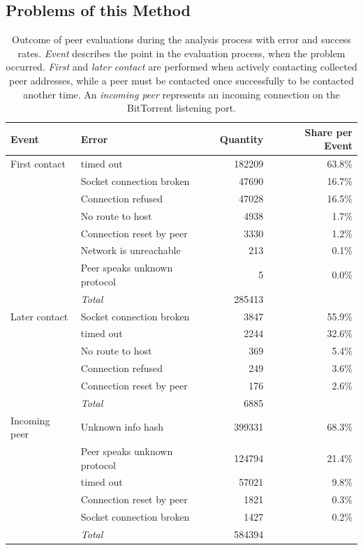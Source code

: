 \documentclass[10pt, a4paper, twoside, headsepline]{scrbook}
\renewcommand{\_}{\origunderscore\allowbreak}
\begin{document}
\subsection{Problems of this Method}
\label{problems}
\begin{table}
\centering
\begin{tabular}{llrr}
\toprule
Event & Error & Quantity & Share per Event \\
\midrule
First contact & timed out & 182209 & 63.8\% \\
& Socket connection broken & 47690 & 16.7\% \\
 & Connection refused & 47028 & 16.5\% \\
 & No route to host & 4938 & 1.7\% \\
 & Connection reset by peer & 3330 & 1.2\% \\
 &  Network is unreachable & 213 & 0.1\% \\
 & Peer speaks unknown protocol & 5 & 0.0\% \\
 & \textit{Total} & 285413 &  \\
\midrule
Later contact & Socket connection broken & 3847 & 55.9\% \\
 & timed out & 2244 & 32.6\% \\
 &  No route to host & 369 & 5.4\% \\
 & Connection refused & 249 & 3.6\% \\
 &  Connection reset by peer & 176 & 2.6\% \\
 & \textit{Total} & 6885 &  \\
\midrule
Incoming peer & Unknown info hash & 399331 & 68.3\% \\
 & Peer speaks unknown protocol & 124794 & 21.4\% \\
 & timed out & 57021 & 9.8\% \\
 & Connection reset by peer & 1821 & 0.3\% \\
 & Socket connection broken & 1427 & 0.2\% \\
 & \textit{Total} & 584394 &  \\
\bottomrule
\end{tabular}
\caption[Reasons for failure of peer evaluation]{Outcome of peer evaluations during the analysis process with error and success rates. \emph{Event} describes the point in the evaluation process, when the problem occurred. \emph{First} and \emph{later contact} are performed when actively contacting collected peer addresses, while a peer must be contacted once successfully to be contacted another time. An \emph{incoming peer} represents an incoming connection on the BitTorrent listening port.} %
\label{connection-failure}
\end{table}
\end{document}
